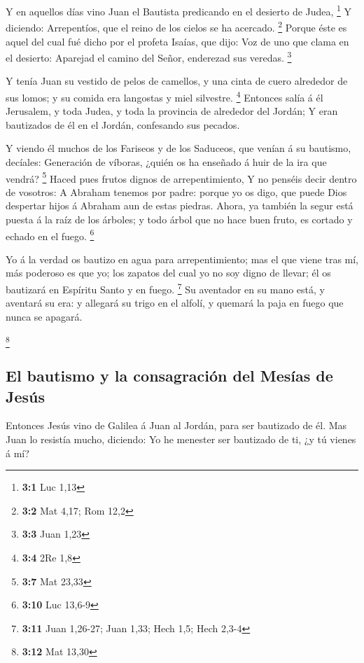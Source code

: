  Y en aquellos días vino Juan el Bautista predicando en el
desierto de Judea, \footnote{\textbf{3:1} Luc 1,13}  Y
diciendo: Arrepentíos, que el reino de los cielos se ha acercado.
\footnote{\textbf{3:2} Mat 4,17; Rom 12,2}  Porque éste es
aquel del cual fué dicho por el profeta Isaías, que dijo: Voz de uno que
clama en el desierto: Aparejad el camino del Señor, enderezad sus
veredas. \footnote{\textbf{3:3} Juan 1,23}

 Y tenía Juan su vestido de pelos de camellos, y una cinta
de cuero alrededor de sus lomos; y su comida era langostas y miel
silvestre. \footnote{\textbf{3:4} 2Re 1,8}  Entonces salía á
él Jerusalem, y toda Judea, y toda la provincia de alrededor del Jordán;
 Y eran bautizados de él en el Jordán, confesando sus
pecados.

 Y viendo él muchos de los Fariseos y de los Saduceos, que
venían á su bautismo, decíales: Generación de víboras, ¿quién os ha
enseñado á huir de la ira que vendrá? \footnote{\textbf{3:7} Mat 23,33}
 Haced pues frutos dignos de arrepentimiento,  Y
no penséis decir dentro de vosotros: A Abraham tenemos por padre: porque
yo os digo, que puede Dios despertar hijos á Abraham aun de estas
piedras.  Ahora, ya también la segur está puesta á la raíz
de los árboles; y todo árbol que no hace buen fruto, es cortado y echado
en el fuego. \footnote{\textbf{3:10} Luc 13,6-9}

 Yo á la verdad os bautizo en agua para arrepentimiento;
mas el que viene tras mí, más poderoso es que yo; los zapatos del cual
yo no soy digno de llevar; él os bautizará en Espíritu Santo y en fuego.
\footnote{\textbf{3:11} Juan 1,26-27; Juan 1,33; Hech 1,5; Hech 2,3-4}
 Su aventador en su mano está, y aventará su era: y
allegará su trigo en el alfolí, y quemará la paja en fuego que nunca se
apagará.

\footnote{\textbf{3:12} Mat 13,30}

\hypertarget{el-bautismo-y-la-consagraciuxf3n-del-mesuxedas-de-jesuxfas}{%
\subsection{El bautismo y la consagración del Mesías de
Jesús}\label{el-bautismo-y-la-consagraciuxf3n-del-mesuxedas-de-jesuxfas}}

 Entonces Jesús vino de Galilea á Juan al Jordán, para ser
bautizado de él.  Mas Juan lo resistía mucho, diciendo: Yo
he menester ser bautizado de ti, ¿y tú vienes á mí?

